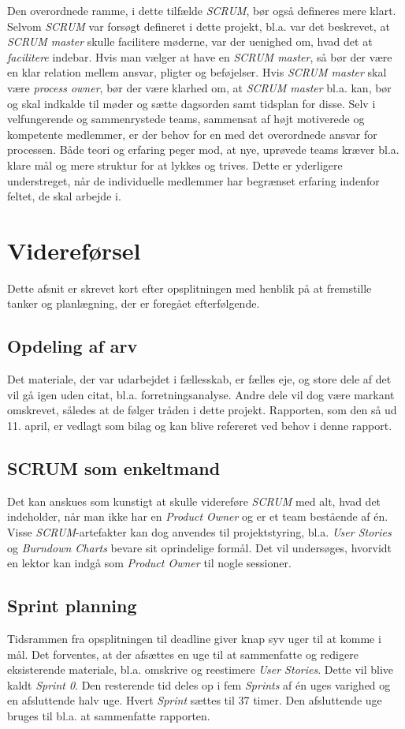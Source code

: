 Den overordnede ramme, i dette tilfælde \emph{SCRUM}, bør også defineres mere klart. 
Selvom \emph{SCRUM} var forsøgt defineret i dette projekt, bl.a. var det beskrevet, at \emph{SCRUM master} skulle facilitere møderne, var der uenighed om, hvad det at \emph{facilitere} indebar. 
Hvis man vælger at have en \emph{SCRUM master}, så bør der være en klar relation mellem ansvar, pligter og beføjelser. 
Hvis \emph{SCRUM master} skal være \emph{process owner}, bør der være klarhed om, at \emph{SCRUM master} bl.a. kan, bør og skal indkalde til møder og sætte dagsorden samt tidsplan for disse. Selv i velfungerende og sammenrystede teams, sammensat af højt motiverede og kompetente medlemmer, er der behov for en med det overordnede ansvar for processen. 
Både teori og erfaring peger mod, at nye, uprøvede teams \cite{mit-newteams} kræver bl.a. klare mål og mere struktur for at lykkes og trives. Dette er yderligere understreget, når de individuelle medlemmer har begrænset erfaring indenfor feltet, de skal arbejde i.

\section{Videreførsel}
Dette afsnit er skrevet kort efter opsplitningen med henblik på at fremstille tanker og planlægning, der er foregået efterfølgende.

\subsection{Opdeling af arv}
Det materiale, der var udarbejdet i fællesskab, er fælles eje, og store dele af det vil gå igen uden citat, bl.a. forretningsanalyse. Andre dele vil dog være markant omskrevet, således at de følger tråden i dette projekt. Rapporten, som den så ud 11. april, er vedlagt som bilag og kan blive refereret ved behov i denne rapport.

\subsection{SCRUM som enkeltmand}
Det kan anskues som kunstigt at skulle videreføre \emph{SCRUM} med alt, hvad det indeholder, når man ikke har en \emph{Product Owner} og er et team bestående af én. Visse \emph{SCRUM}-artefakter kan dog anvendes til projektstyring, bl.a. \emph{User Stories} og \emph{Burndown Charts} bevare sit oprindelige formål. Det vil undersøges, hvorvidt en lektor kan indgå som \emph{Product Owner} til nogle sessioner.

\subsection{Sprint planning}
Tidsrammen fra opsplitningen til deadline giver knap syv uger til at komme i mål. 
Det forventes, at der afsættes en uge til at sammenfatte og redigere eksisterende materiale, bl.a. omskrive og reestimere \emph{User Stories}. Dette vil blive kaldt \emph{Sprint 0}.
Den resterende tid deles op i fem \emph{Sprints} af én uges varighed og en afsluttende halv uge. Hvert \emph{Sprint} sættes til 37 timer. Den afsluttende uge bruges til bl.a. at sammenfatte rapporten.